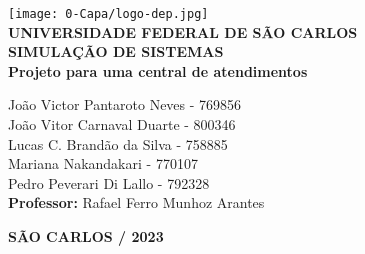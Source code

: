 \justifying %
\onehalfspacing %
\setlength{\parindent}{0cm}  %
\renewcommand*\familydefault{\rmdefault}
\thispagestyle{empty}
\begin{center}
\texttt{[image: 0-Capa/logo-dep.jpg]}\\
\vspace*{.8cm}
{\huge \textbf{UNIVERSIDADE FEDERAL DE SÃO CARLOS}}\\
\vspace*{.8cm}
{\Large \textbf{SIMULAÇÃO DE SISTEMAS}}\\
\vspace*{3cm}
{\Large \textbf{Projeto para uma central de atendimentos}}\\
\vspace*{4.5cm}
\begin{flushright}
    \onehalfspacing
    {\Large  João Victor Pantaroto Neves - 769856}\\
    {\Large  João Vitor Carnaval Duarte - 800346}\\
    {\Large  Lucas C. Brandão da Silva - 758885}\\
    {\Large  Mariana Nakandakari  - 770107}\\
    {\Large  Pedro Peverari Di Lallo  - 792328}\\
    \vspace*{.3cm}
    {\Large \textbf{Professor:}}
    {\Large Rafael Ferro Munhoz Arantes }\\
\end{flushright}
\vspace*{\fill}
{\large \bf SÃO CARLOS / 2023}
\end{center}